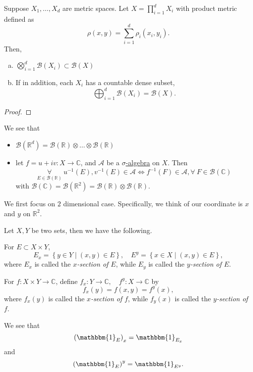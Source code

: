 \begin{theorem}
	Suppose \(X_1, \dots , X_d \) are metric spaces. Let \(X = \prod_{i=1}^{d} X_{i}\) with product metric defined as
	\[
		\rho (x, y) = \sum_{i=1}^{d} \rho _{i}(x_{i}, y_{i}).
	\]
	Then,
	\begin{enumerate}[(a)]
		\item \(\bigotimes_{i=1}^{d}\mathcal{B} (X_{i})\subset \mathcal{B} (X)\)
		\item If in addition, each \(X_{i}\) has a countable dense subset,
		      \[
			      \bigoplus_{i=1}^{d}\mathcal{B} (X_{i}) = \mathcal{B} (X).
		      \]
	\end{enumerate}
\end{theorem}
\begin{proof}
\end{proof}

\begin{remark}
	We see that
	\begin{itemize}
		\item \(\mathcal{B} (\mathbb{R} ^d) = \mathcal{B} (\mathbb{R} )\otimes \dots \otimes \mathcal{B} (\mathbb{R} ) \)
		\item let \(f = u + iv\colon X\to \mathbb{C} \), and \(\mathcal{A} \) be a \hyperref[def:sigma-algebra]{\(\sigma\)-algebra} on \(X\). Then
		      \[
			      \underset{E\in \mathcal{B} (\mathbb{R} )}{\forall }\ u^{-1} (E), v^{-1} (E)\in \mathcal{A}
			      \iff
			      f^{-1} (F)\in \mathcal{A}, \forall\ F\in \mathcal{B} (\mathbb{C} )
		      \]
		      with \(\mathcal{B} (\mathbb{C} ) = \mathcal{B} (\mathbb{R} ^2) = \mathcal{B} (\mathbb{R} )\otimes \mathcal{B} (\mathbb{R} )\).
	\end{itemize}
\end{remark}

We first focus on \(2\) dimensional case. Specifically, we think of our coordinate is \(x\) and \(y\) on \(\mathbb{R} ^2\).

\begin{definition*}
	Let \(X, Y\) be two sets, then we have the following.
	\begin{definition}
		For \(E\subset X\times Y\),
		\[
			E_x = \left\{y\in Y \mid (x, y)\in E\right\},\quad E^y = \left\{x\in X \mid (x, y)\in E\right\},
		\]
		where \(E_x\) is called the \emph{\(x\)-section of \(E\)}, while \(E_y\) is called the \emph{\(y\)-section of \(E\)}.
	\end{definition}
	\begin{definition}
		For \(f\colon X\times Y\to \mathbb{C} \), define \(f_x\colon Y\to \mathbb{C} ,\quad f^y\colon X\to \mathbb{C}\)
		by
		\[
			f_x(y) = f(x, y) = f^y(x),
		\]
		where \(f_x(y)\) is called the \emph{\(x\)-section of \(f\)}, while \(f_y(x)\) is called the \emph{\(y\)-section of \(f\)}.
	\end{definition}
\end{definition*}
\begin{eg}
	We see that
	\[
		\left(\mathbbm{1}_{E} \right)_x = \mathbbm{1}_{E_x}
	\]
	and
	\[
		\left(\mathbbm{1}_{E} \right)^y = \mathbbm{1}_{E^y}.
	\]
\end{eg}


